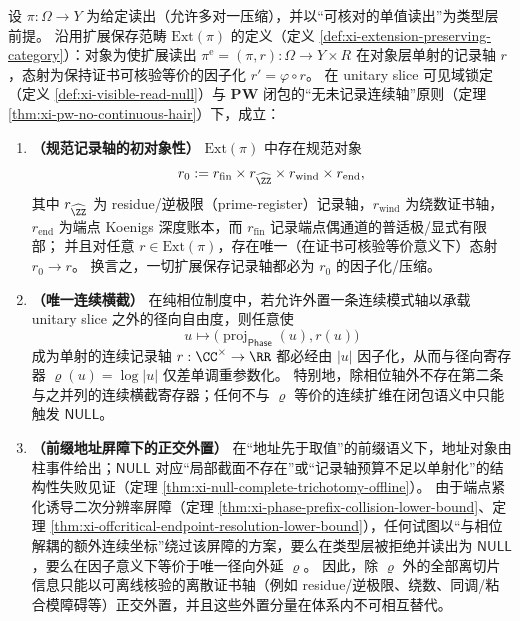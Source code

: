 \begin{theorem}\label{thm:cdim-minimal-record-axis}
设 \(\pi:\Omega\to Y\) 为给定读出（允许多对一压缩），并以“可核对的单值读出”为类型层前提。
沿用扩展保存范畴 \(\mathrm{Ext}(\pi)\) 的定义（定义 \ref{def:xi-extension-preserving-category}）：对象为使扩展读出 \(\pi^{\mathrm e}=(\pi,r):\Omega\to Y\times R\) 在对象层单射的记录轴 \(r\)，态射为保持证书可核验等价的因子化 \(r'=\varphi\circ r\)。
在 unitary slice 可见域锁定（定义 \ref{def:xi-visible-read-null}）与 \(\mathbf{PW}\) 闭包的“无未记录连续轴”原则（定理 \ref{thm:xi-pw-no-continuous-hair}）下，成立：
\begin{enumerate}
  \item \textbf{（规范记录轴的初对象性）}
  \(\mathrm{Ext}(\pi)\) 中存在规范对象
  \[
  r_0:=r_{\mathrm{fin}}\times r_{\widehat{\ZZ}}\times r_{\mathrm{wind}}\times r_{\mathrm{end}},
  \]
  其中 \(r_{\widehat{\ZZ}}\) 为 residue/逆极限（prime-register）记录轴，\(r_{\mathrm{wind}}\) 为绕数证书轴，\(r_{\mathrm{end}}\) 为端点 Koenigs 深度账本，而 \(r_{\mathrm{fin}}\) 记录端点偶通道的普适极/显式有限部；
  并且对任意 \(r\in\mathrm{Ext}(\pi)\)，存在唯一（在证书可核验等价意义下）态射 \(r_0\to r\)。
  换言之，一切扩展保存记录轴都必为 \(r_0\) 的因子化/压缩。

  \item \textbf{（唯一连续横截）}
  在纯相位制度中，若允许外置一条连续模式轴以承载 unitary slice 之外的径向自由度，则任意使
  \[
  u\longmapsto\bigl(\operatorname{proj}_{\mathsf{Phase}}(u),r(u)\bigr)
  \]
  成为单射的连续记录轴 \(r:\CC^\times\to\RR\) 都必经由 \(|u|\) 因子化，从而与径向寄存器 \(\varrho(u)=\log|u|\) 仅差单调重参数化。
  特别地，除相位轴外不存在第二条与之并列的连续横截寄存器；任何不与 \(\varrho\) 等价的连续扩维在闭包语义中只能触发 \(\mathsf{NULL}\)。

  \item \textbf{（前缀地址屏障下的正交外置）}
  在“地址先于取值”的前缀语义下，地址对象由柱事件给出；\(\mathsf{NULL}\) 对应“局部截面不存在”或“记录轴预算不足以单射化”的结构性失败见证（定理 \ref{thm:xi-null-complete-trichotomy-offline}）。
  由于端点紧化诱导二次分辨率屏障（定理 \ref{thm:xi-phase-prefix-collision-lower-bound}、定理 \ref{thm:xi-offcritical-endpoint-resolution-lower-bound}），任何试图以“与相位解耦的额外连续坐标”绕过该屏障的方案，要么在类型层被拒绝并读出为 \(\mathsf{NULL}\)，要么在因子意义下等价于唯一径向外延 \(\varrho\)。
  因此，除 \(\varrho\) 外的全部离切片信息只能以可离线核验的离散证书轴（例如 residue/逆极限、绕数、同调/粘合模障碍等）正交外置，并且这些外置分量在体系内不可相互替代。
\end{enumerate}
\end{theorem}

